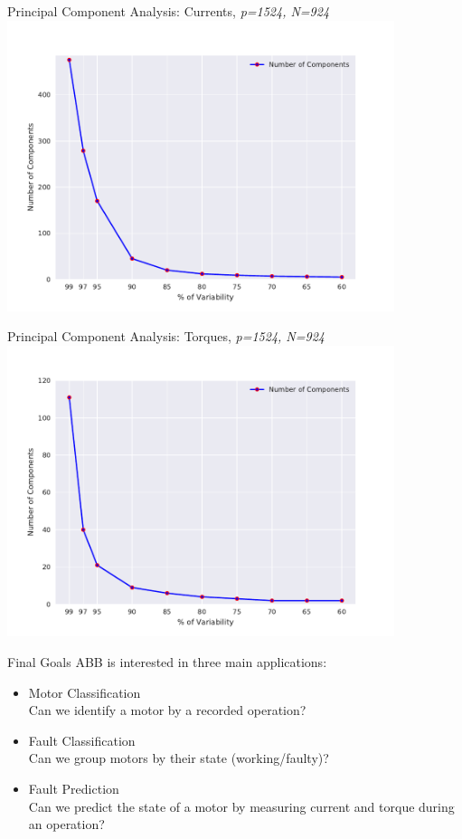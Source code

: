 \documentclass[9pt]{beamer}
\begin{document}
\begin{frame}{Principal Component Analysis: Currents, \textit{p=1524, N=924}}
\centering
\includegraphics[width=0.85\textwidth]{n_pc_curr.pdf}
\end{frame}

\begin{frame}{Principal Component Analysis: Torques, \textit{p=1524, N=924}}
\centering
\includegraphics[width=0.85\textwidth]{n_pc_torq.pdf}
\end{frame}

\begin{frame}{Final Goals}
ABB is interested in three main applications:
\begin{itemize} %
\item {\large Motor Classification}\\
Can we identify a motor by a recorded operation?
\item {\large Fault Classification}\\
Can we group motors by their state (working/faulty)?
\item {\large Fault Prediction}\\
Can we predict the state of a motor by measuring current and torque during an operation?
\end{itemize}
\end{frame}
\end{document}
